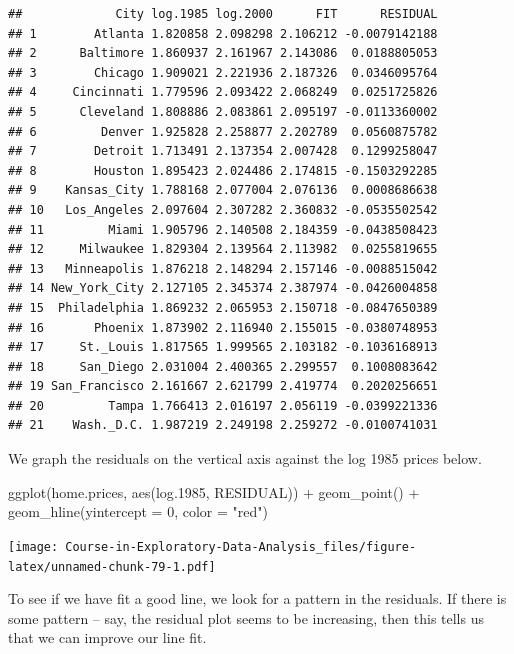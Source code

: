 \documentclass[
]{book}
\newenvironment{Shaded}{\begin{snugshade}}{\end{snugshade}}
\newcommand{\AttributeTok}[1]{\textcolor[rgb]{0.77,0.63,0.00}{#1}}
\newcommand{\DecValTok}[1]{\textcolor[rgb]{0.00,0.00,0.81}{#1}}
\newcommand{\FloatTok}[1]{\textcolor[rgb]{0.00,0.00,0.81}{#1}}
\newcommand{\FunctionTok}[1]{\textcolor[rgb]{0.00,0.00,0.00}{#1}}
\newcommand{\NormalTok}[1]{#1}
\newcommand{\SpecialCharTok}[1]{\textcolor[rgb]{0.00,0.00,0.00}{#1}}
\newcommand{\StringTok}[1]{\textcolor[rgb]{0.31,0.60,0.02}{#1}}
\begin{document}
\begin{verbatim}
##             City log.1985 log.2000      FIT      RESIDUAL
## 1        Atlanta 1.820858 2.098298 2.106212 -0.0079142188
## 2      Baltimore 1.860937 2.161967 2.143086  0.0188805053
## 3        Chicago 1.909021 2.221936 2.187326  0.0346095764
## 4     Cincinnati 1.779596 2.093422 2.068249  0.0251725826
## 5      Cleveland 1.808886 2.083861 2.095197 -0.0113360002
## 6         Denver 1.925828 2.258877 2.202789  0.0560875782
## 7        Detroit 1.713491 2.137354 2.007428  0.1299258047
## 8        Houston 1.895423 2.024486 2.174815 -0.1503292285
## 9    Kansas_City 1.788168 2.077004 2.076136  0.0008686638
## 10   Los_Angeles 2.097604 2.307282 2.360832 -0.0535502542
## 11         Miami 1.905796 2.140508 2.184359 -0.0438508423
## 12     Milwaukee 1.829304 2.139564 2.113982  0.0255819655
## 13   Minneapolis 1.876218 2.148294 2.157146 -0.0088515042
## 14 New_York_City 2.127105 2.345374 2.387974 -0.0426004858
## 15  Philadelphia 1.869232 2.065953 2.150718 -0.0847650389
## 16       Phoenix 1.873902 2.116940 2.155015 -0.0380748953
## 17     St._Louis 1.817565 1.999565 2.103182 -0.1036168913
## 18     San_Diego 2.031004 2.400365 2.299557  0.1008083642
## 19 San_Francisco 2.161667 2.621799 2.419774  0.2020256651
## 20         Tampa 1.766413 2.016197 2.056119 -0.0399221336
## 21    Wash._D.C. 1.987219 2.249198 2.259272 -0.0100741031
\end{verbatim}

We graph the residuals on the vertical axis against the log 1985 prices below.

\begin{Shaded}
\begin{Highlighting}[]
\FunctionTok{ggplot}\NormalTok{(home.prices, }\FunctionTok{aes}\NormalTok{(log}\FloatTok{.1985}\NormalTok{, RESIDUAL)) }\SpecialCharTok{+}
  \FunctionTok{geom\_point}\NormalTok{() }\SpecialCharTok{+}
  \FunctionTok{geom\_hline}\NormalTok{(}\AttributeTok{yintercept =} \DecValTok{0}\NormalTok{, }\AttributeTok{color =} \StringTok{"red"}\NormalTok{)}
\end{Highlighting}
\end{Shaded}

\texttt{[image: Course-in-Exploratory-Data-Analysis\_files/figure-latex/unnamed-chunk-79-1.pdf]}

To see if we have fit a good line, we look for a pattern in the residuals. If there is some pattern -- say, the residual plot seems to be increasing, then this tells us that we can improve our line fit.
\end{document}
